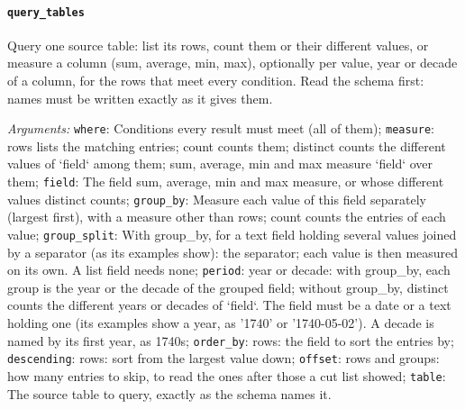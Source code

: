 \paragraph{\texttt{query\_tables}} Query one source table: list its rows, count them or their different values, or measure a column (sum, average, min, max), optionally per value, year or decade of a column, for the rows that meet every condition. Read the schema first: names must be written exactly as it gives them.

\noindent\emph{Arguments:} \texttt{where}: Conditions every result must meet (all of them); \texttt{measure}: rows lists the matching entries; count counts them; distinct counts the different values of `field` among them; sum, average, min and max measure `field` over them; \texttt{field}: The field sum, average, min and max measure, or whose different values distinct counts; \texttt{group\_by}: Measure each value of this field separately (largest first), with a measure other than rows; count counts the entries of each value; \texttt{group\_split}: With group\_by, for a text field holding several values joined by a separator (as its examples show): the separator; each value is then measured on its own. A list field needs none; \texttt{period}: year or decade: with group\_by, each group is the year or the decade of the grouped field; without group\_by, distinct counts the different years or decades of `field`. The field must be a date or a text holding one (its examples show a year, as '1740' or '1740-05-02'). A decade is named by its first year, as 1740s; \texttt{order\_by}: rows: the field to sort the entries by; \texttt{descending}: rows: sort from the largest value down; \texttt{offset}: rows and groups: how many entries to skip, to read the ones after those a cut list showed; \texttt{table}: The source table to query, exactly as the schema names it.
